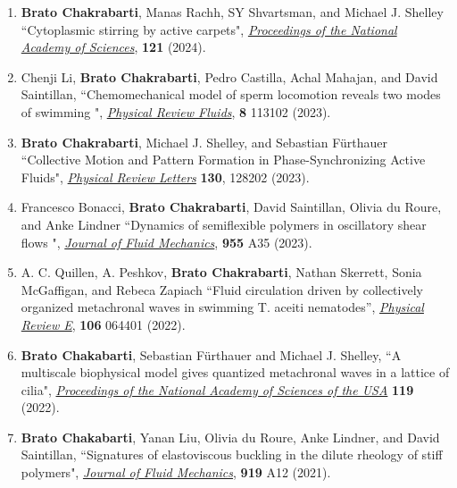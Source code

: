 \documentclass[10pt]{res} %
\begin{document}
\begin{resume}
\begin{enumerate}[topsep=0pt,itemsep= 1ex]
	
\item  \textbf{Brato Chakrabarti}, Manas Rachh, SY Shvartsman, and  Michael J. Shelley ``Cytoplasmic stirring by active carpets",  \href{https://doi.org/10.1073/pnas.2405114121}{\textit{Proceedings of the National Academy of Sciences}},  \textbf{121} (2024).
	
\item Chenji Li, \textbf{Brato Chakrabarti}, Pedro Castilla, Achal Mahajan, and David Saintillan, ``Chemomechanical model of sperm locomotion reveals two modes of swimming
", \href{https://doi.org/10.1103/PhysRevFluids.8.113102}{\textit{Physical Review Fluids}}, \textbf{8} 113102 (2023). 
	
\item  \textbf{Brato Chakrabarti}, Michael J. Shelley, and  Sebastian F\"{u}rthauer ``Collective Motion and Pattern Formation in Phase-Synchronizing Active Fluids", \href{https://doi.org/10.1103/PhysRevLett.130.128202}{\textit{Physical Review Letters}} \textbf{130}, 128202 (2023).

\item Francesco Bonacci, \textbf{Brato Chakrabarti}, David Saintillan, Olivia du Roure, and Anke Lindner ``Dynamics of semiflexible polymers in oscillatory shear flows ", \href{https://doi.org/10.1017/jfm.2022.1040}{\textit{Journal of Fluid Mechanics}},  \textbf{955} A35 (2023).

\item  A. C. Quillen, A. Peshkov, \textbf{Brato Chakrabarti}, Nathan Skerrett, Sonia McGaffigan, and Rebeca Zapiach “Fluid circulation driven by collectively organized metachronal waves in swimming T. aceiti nematodes'',  \href{https://doi.org/10.1103/PhysRevE.106.06440}{\textit{Physical Review E}}, \textbf{106} 064401 (2022).  

\item \textbf{Brato Chakabarti}, Sebastian F\"{u}rthauer and Michael J. Shelley, ``A multiscale biophysical model gives quantized metachronal waves in a lattice of cilia",   \href{https://doi.org/10.1073/pnas.2113539119}{\textit{Proceedings of the National Academy of Sciences of the USA}} \textbf{119} (2022). 

\item \textbf{Brato Chakabarti}, Yanan Liu, Olivia du Roure, Anke Lindner, and David Saintillan, ``Signatures of elastoviscous buckling in the dilute rheology of stiff polymers",  \href{https://doi.org/10.1017/jfm.2021.383}{\textit{Journal of Fluid Mechanics}},  \textbf{919} A12 (2021).


\end{enumerate}
\end{resume}
\end{document}
